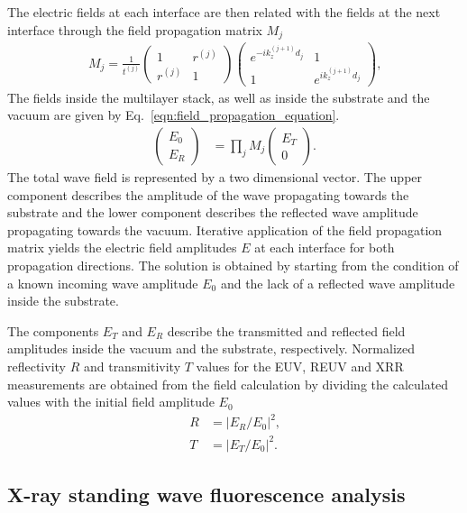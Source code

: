 \documentclass{iucr}              %
\begin{document}
The electric fields at each interface are then related with the fields at the next interface through the field propagation matrix $M_j$ \cite{mikulik1997x}
\begin{align}
M_j = \frac{1}{t^{(j)}}
\begin{pmatrix}
1 & r^{(j)} \\
r^{(j)} & 1
\end{pmatrix}
\begin{pmatrix}
e^{-i k_z^{(j+1)} d_j} & 1 \\
1 & e^{i k_z^{(j+1)} d_j}
\end{pmatrix}
\text{,} \label{eqn:field_propagation_matrix}
\end{align}
The fields inside the multilayer stack, as well as inside the substrate and the vacuum are given by Eq.~\eqref{eqn:field_propagation_equation}.
\begin{align}
\begin{pmatrix}
E_0 \\
E_R
\end{pmatrix} &=
\prod\limits_{j} M_j
\begin{pmatrix}
E_T \\
0
\end{pmatrix} \text{.} \label{eqn:field_propagation_equation}
\end{align} 
The total wave field is represented by a two dimensional vector. The upper component describes the amplitude of the wave propagating towards the substrate and the lower component describes the reflected wave amplitude propagating towards the vacuum. Iterative application of the field propagation matrix yields the electric field amplitudes $E$ at each interface for both propagation directions. The solution is obtained by starting from the condition of a known incoming wave amplitude $E_0$ and the lack of a reflected wave amplitude inside the substrate.

The components $E_T$ and $E_R$ describe the transmitted and reflected field amplitudes inside the vacuum and the substrate, respectively.
Normalized reflectivity $R$ and transmitivity $T$ values for the EUV, REUV and XRR measurements are obtained from the field calculation by dividing the calculated values with the initial field amplitude $E_0$
\begin{align}
R &= |E_R/E_0|^2\text{,} \nonumber\\
T &= |E_T/E_0|^2 \text{.} \label{eqn:refl_trans}
\end{align}

\subsection{X-ray standing wave fluorescence analysis} \label{subsec:xrf_formalism}
\end{document}
